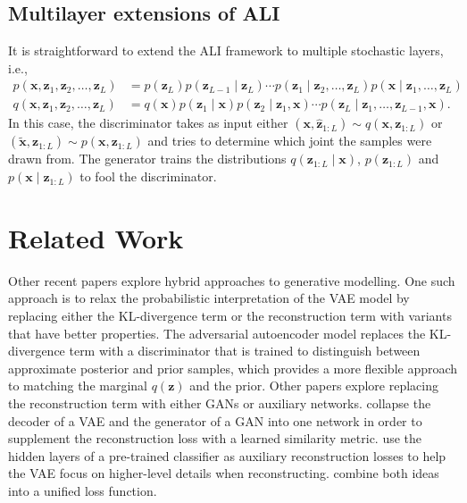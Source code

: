 \documentclass{article}
\begin{document}
\subsection{Multilayer extensions of ALI}
It is straightforward to extend the ALI framework to multiple stochastic layers,
i.e.,
\begin{align}
    p(\bm{x}, \bm{z}_1,\bm{z}_2,\dots,\bm{z}_L) &= p(\bm{z}_L) p(\bm{z}_{L-1}
    \mid \bm{z}_L) \cdots p(\bm{z}_{1} \mid \bm{z}_2, \dots, \bm{z}_L)
    p(\bm{x} \mid \bm{z}_1, \dots, \bm{z}_L) \\
    q(\bm{x}, \bm{z}_1,\bm{z}_2,\dots,\bm{z}_L) &= q(\bm{x}) p(\bm{z}_{1}
    \mid \bm{x}) p(\bm{z}_{2} \mid \bm{z}_1, \bm{x}) \cdots
    p(\bm{z}_{L} \mid \bm{z}_1, \dots, \bm{z}_{L-1}, \bm{x}).
\end{align}
In this case, the discriminator takes as input either $(\bm{x},
\hat{\mathbf{z}}_{1:L}) \sim q(\bm{x}, \mathbf{z}_{1:L})$ or $(\tilde{\bm{x}},
\mathbf{z}_{1:L}) \sim p(\bm{x}, \mathbf{z}_{1:L})$ and tries to determine
which joint the samples were drawn from. The generator trains the distributions
$q(\mathbf{z}_{1:L} \mid \bm{x})$, $p(\mathbf{z}_{1:L})$ and $p(\bm{x} \mid
\mathbf{z}_{1:L})$ to fool the discriminator.

\section{Related Work}

Other recent papers explore hybrid approaches to generative modelling. One such
approach is to relax the probabilistic interpretation of the VAE model by
replacing either the KL-divergence term or the reconstruction term with
variants that have better properties. The adversarial autoencoder model
\citep{makhzani2015adversarial} replaces the KL-divergence term with a
discriminator that is trained to distinguish between approximate posterior and
prior samples, which provides a more flexible approach to matching the marginal
$q(\bm{z})$ and the prior. Other papers explore replacing the reconstruction
term with either GANs or auxiliary networks. \citet{larsen2015autoencoding}
collapse the decoder of a VAE and the generator of a GAN into one network in
order to supplement the reconstruction loss with a learned similarity metric.
\citet{lamb2016discriminative} use the hidden layers of a pre-trained
classifier as auxiliary reconstruction losses to help the VAE focus on
higher-level details when reconstructing. \citet{dosovitskiy2016generating}
combine both ideas into a unified loss function.
\end{document}
